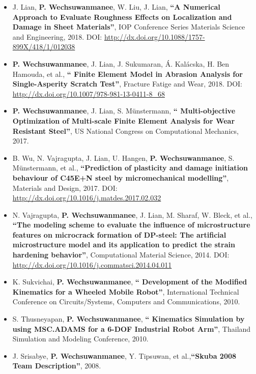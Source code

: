 \begin{itemize}
    \item
    J. Lian, \textbf{P. Wechsuwanmanee}, W. Liu, J. Lian, \textbf{``A Numerical Approach to Evaluate Roughness Effects on Localization and Damage in Sheet Materials''}, IOP Conference Series Materials Science and Engineering, 2018. DOI: \url{http://dx.doi.org/10.1088/1757-899X/418/1/012038}
    
    \item
    \textbf{P. Wechsuwanmanee}, J. Lian, J. Sukumaran, Á. Kalácska, H. Ben Hamouda, et al., \textbf{``
    Finite Element Model in Abrasion Analysis for Single-Asperity Scratch Test''}, Fracture Fatige and Wear, 2018. DOI: \url{http://dx.doi.org/10.1007/978-981-13-0411-8_68}
    
    \item
    \textbf{P. Wechsuwanmanee}, J. Lian, S. Münstermann, \textbf{``
    Multi-objective Optimization of Multi-scale Finite Element Analysis for Wear Resistant Steel''}, US National Congress on Computational Mechanics, 2017.
    
    \item
    B. Wu, N. Vajragupta, J. Lian, U. Hangen, \textbf{P. Wechsuwanmanee}, S. Münstermann, et al., \textbf{``Prediction of plasticity and damage initiation behaviour of C45E+N steel by micromechanical modelling''}, Materials and Design, 2017. DOI: \url{http://dx.doi.org/10.1016/j.matdes.2017.02.032}
    
    
    \item
    N. Vajragupta, \textbf{P. Wechsuwanmanee}, J. Lian, M. Sharaf, W. Bleck, et al., \textbf{``The modeling scheme to evaluate the influence of microstructure features on microcrack formation of DP-steel: The artificial microstructure model and its application to predict the strain hardening behavior''}, Computational Material Science, 2014. DOI: \url{http://dx.doi.org/10.1016/j.commatsci.2014.04.011}
    
    \item
    K. Sukvichai, \textbf{P. Wechsuwanmanee}, \textbf{``
    Development of the Modified Kinematics for a Wheeled Mobile Robot''}, International Technical Conference on Circuits/Systems, Computers and Communications, 2010.
    
    \item
    S. Thusneyapan, \textbf{P. Wechsuwanmanee}, \textbf{``
    Kinematics Simulation by using MSC.ADAMS for a 6-DOF Industrial Robot Arm''}, Thailand Simulation and Modeling Conference, 2010. 
    
    \item
    J. Srisabye, \textbf{P. Wechsuwanmanee}, Y. Tipsuwan, et al.,\textbf{``Skuba 2008 Team Description''}, 2008.
    
    \end{itemize}